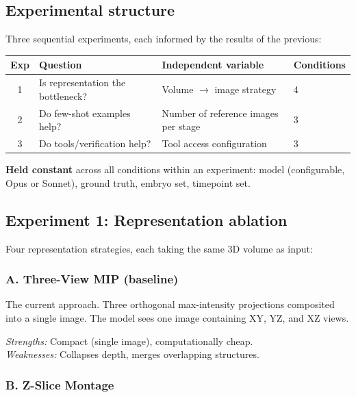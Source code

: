 \documentclass[11pt, a4paper]{article}
\begin{document}
\subsection{Experimental structure}

Three sequential experiments, each informed by the results of the previous:

\begin{center}
\small
\begin{tabularx}{\textwidth}{@{}clXl@{}}
\toprule
\textbf{Exp} & \textbf{Question} & \textbf{Independent variable}
  & \textbf{Conditions} \\
\midrule
1 & Is representation the bottleneck?
  & Volume $\to$ image strategy
  & 4 \\
2 & Do few-shot examples help?
  & Number of reference images per stage
  & 3 \\
3 & Do tools/verification help?
  & Tool access configuration
  & 3 \\
\bottomrule
\end{tabularx}
\end{center}

\textbf{Held constant} across all conditions within an experiment: model
(configurable, Opus or Sonnet), ground truth, embryo set, timepoint set.

\subsection{Experiment 1: Representation ablation}

Four representation strategies, each taking the same 3D volume as input:

\subsubsection{A. Three-View MIP (baseline)}

The current approach. Three orthogonal max-intensity projections composited into a
single image. The model sees one image containing XY, YZ, and XZ views.

\textit{Strengths:} Compact (single image), computationally cheap.\\
\textit{Weaknesses:} Collapses depth, merges overlapping structures.

\subsubsection{B. Z-Slice Montage}
\end{document}
